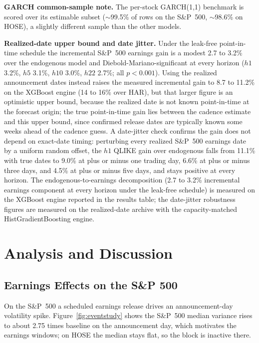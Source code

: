 \documentclass[runningheads]{llncs}
\begin{document}
\textbf{GARCH common-sample note.} The per-stock GARCH(1,1) benchmark is scored over its estimable subset
($\sim$99.5\% of rows on the S\&P~500, $\sim$98.6\% on HOSE), a slightly different sample than the other
models.

\textbf{Realized-date upper bound and date jitter.} Under the leak-free point-in-time schedule the
incremental S\&P~500 earnings gain is a modest 2.7 to 3.2\% over the endogenous model and
Diebold-Mariano-significant at every horizon ($h1$ 3.2\%, $h5$ 3.1\%, $h10$ 3.0\%, $h22$ 2.7\%; all
$p<0.001$). Using the realized announcement dates instead raises the measured incremental gain to 8.7 to
11.2\% on the XGBoost engine (14 to 16\% over HAR), but that larger figure is an optimistic upper bound,
because the realized date is not known point-in-time at the forecast origin; the true point-in-time gain
lies between the cadence estimate and this upper bound, since confirmed release dates are typically known
some weeks ahead of the cadence guess. A date-jitter check confirms the gain does not depend on
exact-date timing: perturbing every realized S\&P~500 earnings date by a uniform random offset, the $h1$
QLIKE gain over endogenous falls from 11.1\% with true dates to 9.0\% at plus or minus one trading day,
6.6\% at plus or minus three days, and 4.5\% at plus or minus five days, and stays positive at every
horizon.
The endogenous-to-earnings decomposition (2.7 to 3.2\% incremental earnings component at every horizon
under the leak-free schedule) is measured on the XGBoost engine reported in the results table; the
date-jitter robustness figures are measured on the realized-date archive with the capacity-matched
HistGradientBoosting engine.

\FloatBarrier

\section{Analysis and Discussion}

\subsection{Earnings Effects on the S\&P 500}\label{sec:earn}
On the S\&P~500 a scheduled earnings release drives an announcement-day volatility spike.
Figure~\ref{fig:eventstudy} shows the S\&P~500 median variance rises to about 2.75 times baseline on
the announcement day, which motivates the earnings windows; on HOSE the median stays flat, so the block
is inactive there.
\end{document}
